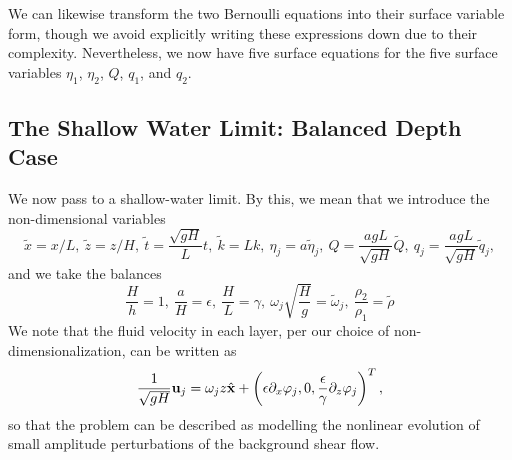 \documentclass[a4paper,11pt]{article}
\newcommand{\p}{\partial}
\begin{document}
We can likewise transform the two Bernoulli equations into their surface variable form, though we avoid explicitly writing these expressions down due to their complexity.  Nevertheless, we now have five surface equations for the five surface variables $\eta_{1}$, $\eta_{2}$, $Q$, $q_{1}$, and $q_{2}$.
\subsection{The Shallow Water Limit: Balanced Depth Case}
We now pass to a shallow-water limit.  By this, we mean that we introduce the non-dimensional variables 
\[
\tilde{x} = x/L,~\tilde{z}=z/H,~ \tilde{t} = \frac{\sqrt{gH}}{L}t,~\tilde{k}=Lk,~ \eta_{j} = a\tilde{\eta}_{j},~ Q = \frac{agL}{\sqrt{gH}}\tilde{Q}, ~ q_{j} = \frac{agL}{\sqrt{gH}}\tilde{q}_{j}, 
\]
and we take the balances
\[
\frac{H}{h} = 1, ~ \frac{a}{H} = \epsilon,  ~ \frac{H}{L} = \gamma, ~ \omega_{j}\sqrt{\frac{H}{g}}  = \tilde{\omega}_{j}, ~ \frac{\rho_{2}}{\rho_{1}} = \tilde{\rho} 
\]
We note that the fluid velocity in each layer, per our choice of non-dimensionalization, can be written as 
\[
\frac{1}{\sqrt{gH}}{\bf u}_{j} = \omega_{j}z\hat{\bf {x}} + \left(\epsilon \p_{x}\varphi_{j},0,\frac{\epsilon}{\gamma}\p_{z}\varphi_{j} \right)^{T},
\]
so that the problem can be described as modelling the nonlinear evolution of small amplitude perturbations of the background shear flow.  
\end{document}
